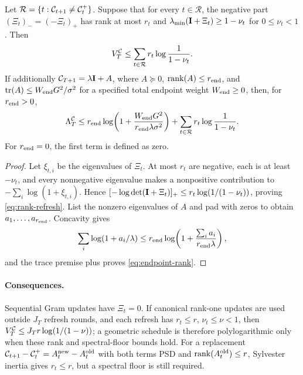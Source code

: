 \begin{lemma}\label{lem:rank-refresh}
Let $\mathcal R=\{t:\mathcal{C}_{t+1}\ne\mathcal{C}_t^+\}$.  Suppose that for every
$t\in\mathcal R$, the negative part $(\Xi_t)_-=(-\Xi_t)_+$ has rank at
most $r_t$ and
$\lambda_{\min}(\mathbf{I}+\Xi_t)\ge1-\nu_t$ for $0\le\nu_t<1$.  Then
\begin{equation}\label{eq:rank-refresh}
 V^{\mathcal{C}}_T\le\sum_{t\in\mathcal R}r_t\log\frac1{1-\nu_t}.
\end{equation}
If additionally
$\mathcal{C}_{T+1}=\lambda\mathbf{I}+A$, where $A\succeq0$,
$\operatorname{rank}(A)\le r_{\rm end}$, and
$\operatorname{tr}(A)\le W_{\rm end}G^2/\sigma^2$ for a specified total
endpoint weight $W_{\rm end}\ge0$, then, for $r_{\rm end}>0$,
\begin{equation}\label{eq:endpoint-rank}
 \Lambda^{\mathcal{C}}_T\le r_{\rm end}\log\!\left(
 1+\frac{W_{\rm end}G^2}{r_{\rm end}\lambda\sigma^2}\right)
 +\sum_{t\in\mathcal R}r_t\log\frac1{1-\nu_t}.
\end{equation}
For $r_{\rm end}=0$, the first term is defined as zero.
\end{lemma}
\begin{proof}
Let $\xi_{t,i}$ be the eigenvalues of $\Xi_t$.  At most $r_t$ are
negative, each is at least $-\nu_t$, and every nonnegative eigenvalue makes
a nonpositive contribution to $-\sum_i\log(1+\xi_{t,i})$.  Hence
$[-\log\det(\mathbf{I}+\Xi_t)]_+\le r_t\log(1/(1-\nu_t))$, proving
\eqref{eq:rank-refresh}.  List the nonzero eigenvalues of $A$ and pad with
zeros to obtain $a_1,\ldots,a_{r_{\rm end}}$.  Concavity gives
\[
 \sum_i\log(1+a_i/\lambda)
 \le r_{\rm end}\log\!\left(1+
 \frac{\sum_i a_i}{r_{\rm end}\lambda}\right),
\]
and the trace premise plus  proves
\eqref{eq:endpoint-rank}.
\end{proof}

\paragraph{Consequences.}
Sequential Gram updates have $\Xi_t=0$.  If canonical rank-one updates are
used outside $J_T$ refresh rounds, and each refresh has
$r_t\le r$, $\nu_t\le\nu<1$, then
$V^{\mathcal{C}}_T\le J_Tr\log(1/(1-\nu))$; a geometric schedule is therefore
polylogarithmic only when these rank and spectral-floor bounds hold.
For a replacement
$\mathcal{C}_{t+1}-\mathcal{C}_t^+=A_t^{\rm new}-A_t^{\rm old}$ with both terms PSD
and $\operatorname{rank}(A_t^{\rm old})\le r$, Sylvester inertia gives
$r_t\le r$, but a spectral floor is still required.

